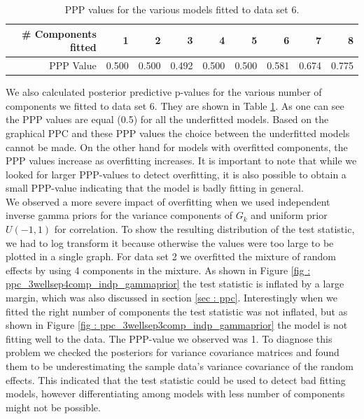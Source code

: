 \begin{table}[!htb]
\centering
\captionsetup{justification=centering}
\caption{PPP values for the various models fitted to data set 6.}
\label{table : ppp_value_5welsepcomp}
\begin{tabular}{@{}rrrrrrrrr@{}}
\toprule
\# Components fitted & 1 & 2 & 3 & 4 & 5 & 6 & 7 & 8 \\ \midrule
PPP Value & 0.500 & 0.500 & 0.492 & 0.500 & 0.500 & 0.581 & 0.674 & 0.775 \\ \bottomrule
\end{tabular}
\end{table}

We also calculated posterior predictive p-values for the various number of components we fitted to data set 6. They are shown in Table \ref{table : ppp_value_5welsepcomp}. As one can see the PPP values are equal (0.5) for all the underfitted models. Based on the graphical PPC and these PPP values the choice between the underfitted models cannot be made. On the other hand for models with overfitted components, the PPP values increase as overfitting increases. It is important to note that while we looked for larger PPP-values to detect overfitting, it is also possible to obtain a small PPP-value indicating that the model is badly fitting in general.\\

We observed a more severe impact of overfitting when we used independent inverse gamma priors for the variance components of $G_k$ and uniform prior $U(-1,1)$ for correlation. To show the resulting distribution of the test statistic, we had to log transform it because otherwise the values were too large to be plotted in a single graph. For data set 2 we overfitted the mixture of random effects by using 4 components in the mixture. As shown in Figure \ref{fig : ppc_3wellsep4comp_indp_gammaprior} the test statistic is inflated by a large margin, which was also discussed in section \ref{sec : ppc}. Interestingly when we fitted the right number of components the test statistic was not inflated, but as shown in Figure \ref{fig : ppc_3wellsep3comp_indp_gammaprior} the model is not fitting well to the data. The PPP-value we observed was 1. To diagnose this problem we checked the posteriors for variance covariance matrices and found them to be underestimating the sample data's variance covariance of the random effects. This indicated that the test statistic could be used to detect bad fitting models, however differentiating among models with less number of components might not be possible.\\

